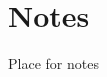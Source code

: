 \documentclass[fleqn,12pt]{article}
\begin{document}
\newpage
\newpage
\small



\newpage

\section{Notes}

Place for notes
\end{document}
